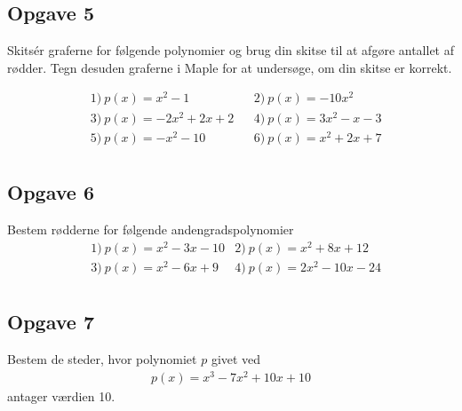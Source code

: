 \subsection*{Opgave 5}
Skitsér graferne for følgende polynomier og brug din skitse til at afgøre antallet af rødder. Tegn desuden graferne i Maple for at undersøge, om din skitse er korrekt.

\begin{align*}
&1) \  p(x) = x^2-1   &&2) \ p(x) = -10x^2    \\
&3) \  p(x) = -2x^2+2x+2  &&4) \  p(x) = 3x^2-x-3   \\
&5) \ p(x) = -x^2-10    &&6) \  p(x) = x^2+2x+7   \\
\end{align*}

\subsection*{Opgave 6}
Bestem rødderne for følgende andengradspolynomier
\begin{align*}
	&1) \ p(x) = x^2 - 3x - 10  &2) \   p(x) = x^2 + 8x + 12 \\
	&3) \ p(x) = x^2 -6x + 9  &4) \   p(x) = 2x^2-10x-24 \\
\end{align*}

\subsection*{Opgave 7}
Bestem de steder, hvor polynomiet $p$ givet ved
\begin{align*}
	p(x) = x^3 - 7x^2 + 10x + 10
\end{align*}
antager værdien 10.

